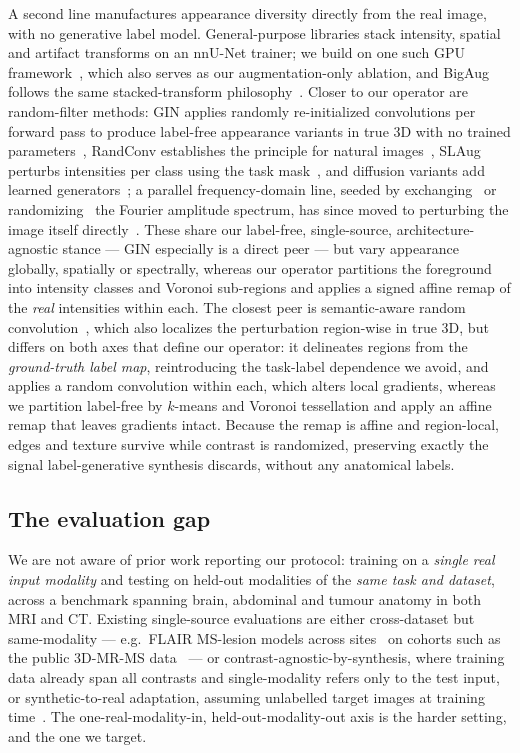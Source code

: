 A second line manufactures appearance diversity directly from the real image,
with no generative label model. General-purpose libraries stack intensity,
spatial and artifact transforms on an nnU-Net trainer; we build on one such GPU
framework~\cite{molinier2026auglab,isensee2021nnunet}, which also serves as our
augmentation-only ablation, and BigAug follows the same stacked-transform
philosophy~\cite{zhang2020bigaug}. Closer to our operator are random-filter
methods: GIN applies randomly re-initialized convolutions per forward pass to
produce label-free appearance variants in true 3D with no trained
parameters~\cite{ouyang2022gin}, RandConv establishes the principle for natural
images~\cite{xu2021randconv}, SLAug perturbs intensities per class using the
task mask~\cite{su2023slaug}, and diffusion variants add learned
generators~\cite{chen2024diffusionsdg}; a parallel frequency-domain line,
seeded by exchanging~\cite{xu2021fact} or randomizing~\cite{huang2021fsdr} the
Fourier amplitude spectrum, has since moved to perturbing the image itself
directly~\cite{zhao2024morestyle,li2024raffesdg,qiao2024ras}. These share our
label-free, single-source, architecture-agnostic stance --- GIN especially is a
direct peer --- but vary appearance globally, spatially or spectrally, whereas
our operator partitions the foreground into intensity classes and Voronoi
sub-regions and applies a signed affine remap of the \emph{real} intensities
within each. The closest peer is semantic-aware random
convolution~\cite{thaler2025semrandconv}, which also localizes the perturbation
region-wise in true 3D, but differs on both axes that define our operator: it
delineates regions from the \emph{ground-truth label map}, reintroducing the
task-label dependence we avoid, and applies a random convolution within each,
which alters local gradients, whereas we partition label-free by $k$-means and
Voronoi tessellation and apply an affine remap that leaves gradients intact.
Because the remap is affine and region-local, edges and texture survive while
contrast is randomized, preserving exactly the signal label-generative synthesis
discards, without any anatomical labels.

\subsection{The evaluation gap}
\label{subsec:gap}

We are not aware of prior work reporting our protocol: training on a
\emph{single real input modality} and testing on held-out modalities of the
\emph{same task and dataset}, across a benchmark spanning brain, abdominal and
tumour anatomy in both MRI and CT. Existing single-source evaluations are either
cross-dataset but same-modality --- e.g.\ FLAIR MS-lesion models across
sites~\cite{badea2024generalizable} on cohorts such as the public 3D-MR-MS
data~\cite{lesjak2018openms} --- or contrast-agnostic-by-synthesis, where
training data already span all contrasts and single-modality refers only to
the test input, or synthetic-to-real adaptation, assuming unlabelled target
images at training time~\cite{sankaranarayanan2018synthetic}. The
one-real-modality-in, held-out-modality-out axis is the harder setting, and the
one we target.

